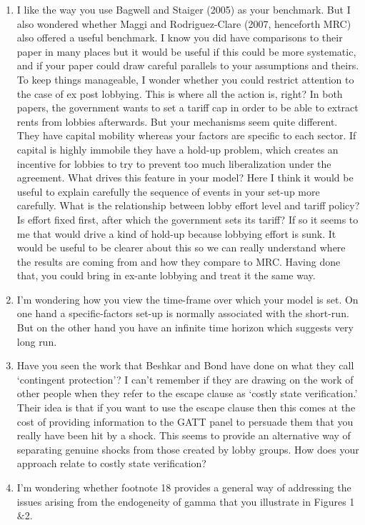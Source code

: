\documentclass[12pt]{article}
\begin{document}
\begin{enumerate}
	\item I like the way you use Bagwell and Staiger (2005) as your benchmark.  But I also wondered whether Maggi and Rodriguez-Clare (2007, henceforth MRC) also offered a useful benchmark.  I know you did have comparisons to their paper in many places but it would be useful if this could be more systematic, and if your paper could draw careful parallels to your assumptions and theirs.  To keep things manageable, I wonder whether you could restrict attention to the case of ex post lobbying.  This is where all the action is, right?  In both papers, the government wants to set a tariff cap in order to be able to extract rents from lobbies afterwards.  But your mechanisms seem quite different.  They have capital mobility whereas your factors are specific to each sector.  If capital is highly immobile they have a hold-up problem, which creates an incentive for lobbies to try to prevent too much liberalization under the agreement.  What drives this feature in your model?  Here I think it would be useful to explain carefully the sequence of events in your set-up more carefully.  What is the relationship between lobby effort level and tariff policy?  Is effort fixed first, after which the government sets its tariff?  If so it seems to me that would drive a kind of hold-up because lobbying effort is sunk.  It would be useful to be clearer about this so we can really understand where the results are coming from and how they compare to MRC.  Having done that, you could bring in ex-ante lobbying and treat it the same way.      
 
	\item I'm wondering how you view the time-frame over which your model is set.  On one hand a specific-factors set-up is normally associated with the short-run.  But on the other hand you have an infinite time horizon which suggests very long run.
 
	\item Have you seen the work that Beshkar and Bond have done on what they call `contingent protection'?  I can't remember if they are drawing on the work of other people when they refer to the escape clause as `costly state verification.'  Their idea is that if you want to use the escape clause then this comes at the cost of providing information to the GATT panel to persuade them that you really have been hit by a shock.  This seems to provide an alternative way of separating genuine shocks from those created by lobby groups.  How does your approach relate to costly state verification?
 
	\item I'm wondering whether footnote 18 provides a general way of addressing the issues arising from the endogeneity of gamma that you illustrate in Figures 1$\&$2.
\end{enumerate}
\end{document}
